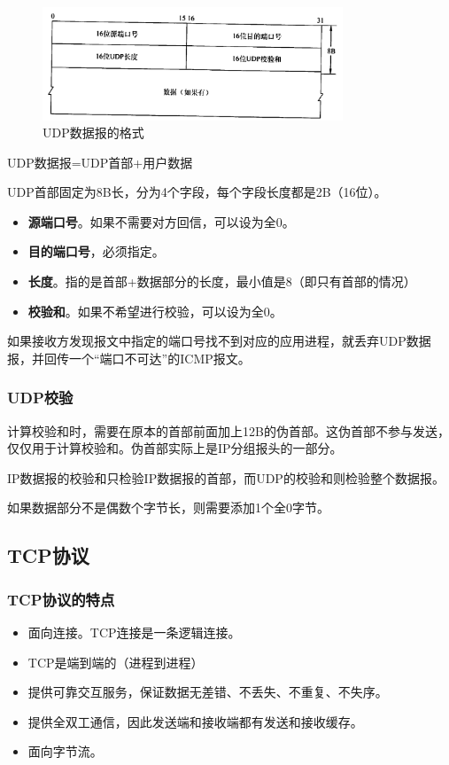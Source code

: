 \documentclass[12pt, a4paper, oneside]{ctexart}
\begin{document}
\begin{figure}[h]
    \centering
    \includegraphics[width=0.8\textwidth]{./images/udp_header.png}
    \caption{UDP数据报的格式}
\end{figure}

UDP数据报=UDP首部+用户数据

UDP首部固定为8B长，分为4个字段，每个字段长度都是2B（16位）。
\begin{itemize}
    \item {\bf 源端口号}。如果不需要对方回信，可以设为全0。
    \item {\bf 目的端口号}，必须指定。
    \item {\bf 长度}。指的是首部+数据部分的长度，最小值是8（即只有首部的情况）
    \item {\bf 校验和}。如果不希望进行校验，可以设为全0。
\end{itemize}

如果接收方发现报文中指定的端口号找不到对应的应用进程，就丢弃UDP数据报，并回传一个“端口不可达”的ICMP报文。

\subsubsection{UDP校验}

计算校验和时，需要在原本的首部前面加上12B的伪首部。这伪首部不参与发送，仅仅用于计算校验和。伪首部实际上是IP分组报头的一部分。

IP数据报的校验和只检验IP数据报的首部，而UDP的校验和则检验整个数据报。

如果数据部分不是偶数个字节长，则需要添加1个全0字节。

\subsection{TCP协议}

\subsubsection{TCP协议的特点}

\begin{itemize}
    \item 面向连接。TCP连接是一条逻辑连接。
    \item TCP是端到端的（进程到进程）
    \item 提供可靠交互服务，保证数据无差错、不丢失、不重复、不失序。
    \item 提供全双工通信，因此发送端和接收端都有发送和接收缓存。
    \item 面向字节流。
\end{itemize}
\end{document}
